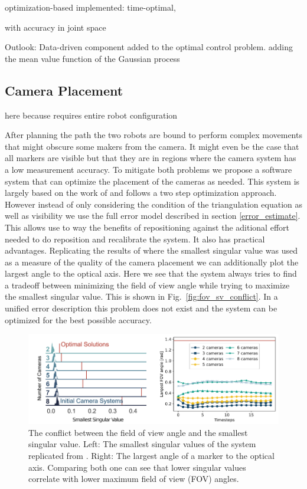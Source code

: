 \documentclass[5p,times,procedia]{elsarticle}
\begin{document}
optimization-based
implemented: time-optimal, 

with accuracy in joint space

Outlook: Data-driven component added to the optimal control problem.
adding the mean value function of the Gaussian process

\subsection{Camera Placement}
here because requires entire robot configuration

After planning the path the two robots are bound to perform complex movements that might obscure some makers from the camera.
It might even be the case that all markers are visible but that they are in regions where the camera system has a low measurement accuracy.
To mitigate both problems we propose a software system that can optimize the placement of the cameras as needed.
This system is largely based on the work of \cite{camera_placement} and follows a two step optimization approach.
However instead of only considering the condition of the triangulation equation as well as visibility we use the full error model described in section \ref{error_estimate}.
This allows use to way the benefits of repositioning against the aditional effort needed to do reposition and recalibrate the system.
It also has practical advantages.
Replicating the results of \cite{camera_placement} where the smallest singular value was used as a measure of the quality of the camera placement we can additionally plot the largest angle to the optical axis.
Here we see that the system always tries to find a tradeoff between minimizing the field of view angle while trying to maximize the smallest singular value.
This is shown in Fig.~\ref{fig:fov_sv_conflict}.
In a unified error description this problem does not exist and the system can be optimized for the best possible accuracy.
\begin{figure}[h]
	\centering
	\includegraphics[width=\columnwidth]{graphics/fov_sv_conflict.png}
	\caption{The conflict between the field of view angle and the smallest singular value. Left: The smallest singular values of the system replicated from \cite{camera_placement}. Right: The largest angle of a marker to the optical axis.
		Comparing both one can see that lower singular values correlate with lower maximum field of view (FOV) angles.}
\end{figure}
\end{document}
